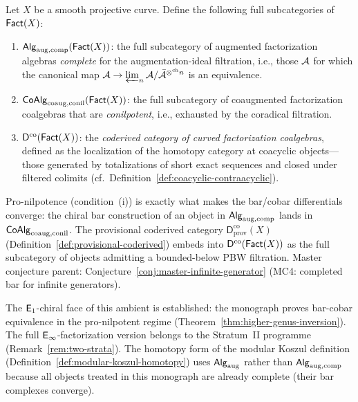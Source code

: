 \begin{definition}
\label{def:completed-chiral-ambient}
Let $X$ be a smooth projective curve.  Define the following full
subcategories of $\mathsf{Fact}(X)$:
\begin{enumerate}[label=\textup{(\roman*)}]
\item $\mathsf{Alg}_{\mathrm{aug,comp}}(\mathsf{Fact}(X))$: the full subcategory of
  augmented factorization algebras \emph{complete} for the
  augmentation-ideal filtration, i.e., those $\mathcal{A}$ for which the
  canonical map
  $\mathcal{A} \to \varprojlim_n \mathcal{A} / \bar{\mathcal{A}}^{\otimes^{\mathrm{ch}} n}$
  is an equivalence.
\item $\mathsf{CoAlg}_{\mathrm{coaug,conil}}(\mathsf{Fact}(X))$: the full subcategory
  of coaugmented factorization coalgebras that are \emph{conilpotent},
  i.e., exhausted by the coradical filtration.
\item $\mathsf{D}^{\mathrm{co}}(\mathsf{Fact}(X))$: the \emph{coderived
  category of curved factorization coalgebras}, defined as the
  localization of the homotopy category at coacyclic objects---those
  generated by totalizations of short exact sequences and closed under
  filtered colimits (cf.\
  Definition~\ref{def:coacyclic-contraacyclic}).
\end{enumerate}
Pro-nilpotence (condition~(i)) is exactly what makes the bar/cobar
differentials converge: the chiral bar construction of an object in
$\mathsf{Alg}_{\mathrm{aug,comp}}$ lands in $\mathsf{CoAlg}_{\mathrm{coaug,conil}}$.
The provisional coderived category
$\mathsf{D}^{\mathrm{co}}_{\mathrm{prov}}(X)$
(Definition~\ref{def:provisional-coderived}) embeds into
$\mathsf{D}^{\mathrm{co}}(\mathsf{Fact}(X))$
as the full subcategory of objects admitting a bounded-below PBW
filtration.
\textup{Master conjecture parent:}
Conjecture~\textup{\ref{conj:master-infinite-generator}} \textup{(MC4: completed bar for infinite generators).}
\end{definition}

\begin{remark}[Status]\label{rem:completed-ambient-status}
The $\mathsf{E}_1$-chiral face of this ambient is established: the
monograph proves bar-cobar equivalence in the pro-nilpotent regime
(Theorem~\ref{thm:higher-genus-inversion}).  The full
$\mathsf{E}_{\infty}$-factorization version belongs to the Stratum~II programme
(Remark~\ref{rem:two-strata}).  The homotopy form of the modular
Koszul definition
(Definition~\ref{def:modular-koszul-homotopy}) uses
$\mathsf{Alg}_{\mathrm{aug}}$ rather than
$\mathsf{Alg}_{\mathrm{aug,comp}}$ because all objects treated in this
monograph are already complete (their bar complexes converge).
\end{remark}


